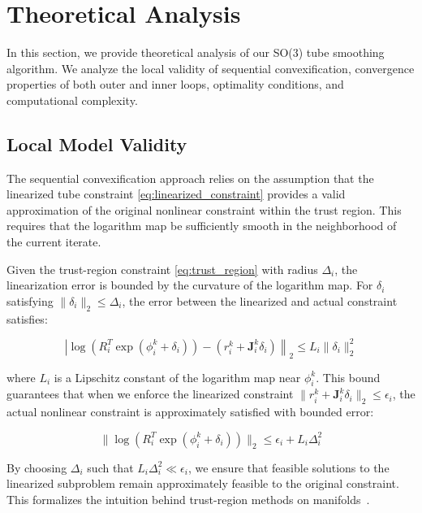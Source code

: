 \section{Theoretical Analysis}

In this section, we provide theoretical analysis of our SO(3) tube smoothing algorithm. We analyze the local validity of sequential convexification, convergence properties of both outer and inner loops, optimality conditions, and computational complexity.

\subsection{Local Model Validity}

The sequential convexification approach relies on the assumption that the linearized tube constraint \eqref{eq:linearized_constraint} provides a valid approximation of the original nonlinear constraint within the trust region. This requires that the logarithm map be sufficiently smooth in the neighborhood of the current iterate.

Given the trust-region constraint \eqref{eq:trust_region} with radius $\Delta_i$, the linearization error is bounded by the curvature of the logarithm map. For $\delta_i$ satisfying $\|\delta_i\|_2 \leq \Delta_i$, the error between the linearized and actual constraint satisfies:

\begin{equation}
\label{eq:linearization_error}
\left| \log\left(R_i^T \exp(\phi_i^k + \delta_i)\right) - \left( r_i^k + \mathbf{J}_i^k \delta_i \right) \right\|_2 \leq L_i \|\delta_i\|_2^2
\end{equation}

where $L_i$ is a Lipschitz constant of the logarithm map near $\phi_i^k$. This bound guarantees that when we enforce the linearized constraint $\|r_i^k + \mathbf{J}_i^k \delta_i\|_2 \leq \epsilon_i$, the actual nonlinear constraint is approximately satisfied with bounded error:

\begin{equation}
\label{eq:actual_violation}
\| \log(R_i^T \exp(\phi_i^k + \delta_i)) \|_2 \leq \epsilon_i + L_i \Delta_i^2
\end{equation}

By choosing $\Delta_i$ such that $L_i \Delta_i^2 \ll \epsilon_i$, we ensure that feasible solutions to the linearized subproblem remain approximately feasible to the original constraint. This formalizes the intuition behind trust-region methods on manifolds~\cite{conn}.

